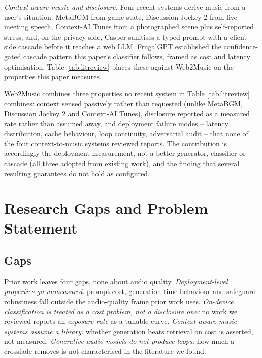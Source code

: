 \documentclass[conference]{IEEEtran}
\begin{document}
\emph{Context-aware music and disclosure.} Four recent systems derive
music from a user's situation: MetaBGM \cite{metabgm} from game state,
Discussion Jockey 2 \cite{discussionjockey} from live meeting speech,
Context-AI Tunes \cite{contextaitunes} from a photographed scene plus
self-reported stress, and, on the privacy side, Casper \cite{casper}
sanitises a typed prompt with a client-side cascade before it reaches a
web LLM. FrugalGPT \cite{frugalgpt} established the confidence-gated
cascade pattern this paper's classifier follows, framed as cost and
latency optimisation. Table \ref{tab:litreview} places these against
Web2Music on the properties this paper measures.

Web2Music combines three properties no recent system in Table
\ref{tab:litreview} combines: context sensed passively rather than
requested (unlike MetaBGM, Discussion Jockey 2 and Context-AI Tunes),
disclosure reported as a measured rate rather than assumed away, and
deployment failure modes -- latency distribution, cache behaviour,
loop continuity, adversarial audit -- that none of the four
context-to-music systems reviewed reports. The contribution is
accordingly the deployment measurement, not a better generator,
classifier or cascade (all three adopted from existing work), and the
finding that several resulting guarantees do not hold as configured.

\section{Research Gaps and Problem Statement}
\label{sec:gaps}

\subsection{Gaps}

Prior work leaves four gaps, none about audio quality.
\emph{Deployment-level properties go unmeasured:} prompt cost,
generation-time behaviour and safeguard robustness fall outside the
audio-quality frame prior work uses. \emph{On-device classification is
treated as a cost problem, not a disclosure one:} no work we reviewed
reports an \emph{exposure rate} as a tunable curve. \emph{Context-aware
music systems assume a library:} whether generation beats retrieval on
cost is asserted, not measured. \emph{Generative audio models do not
produce loops:} how much a crossfade removes is not characterised in the
literature we found.
\end{document}

